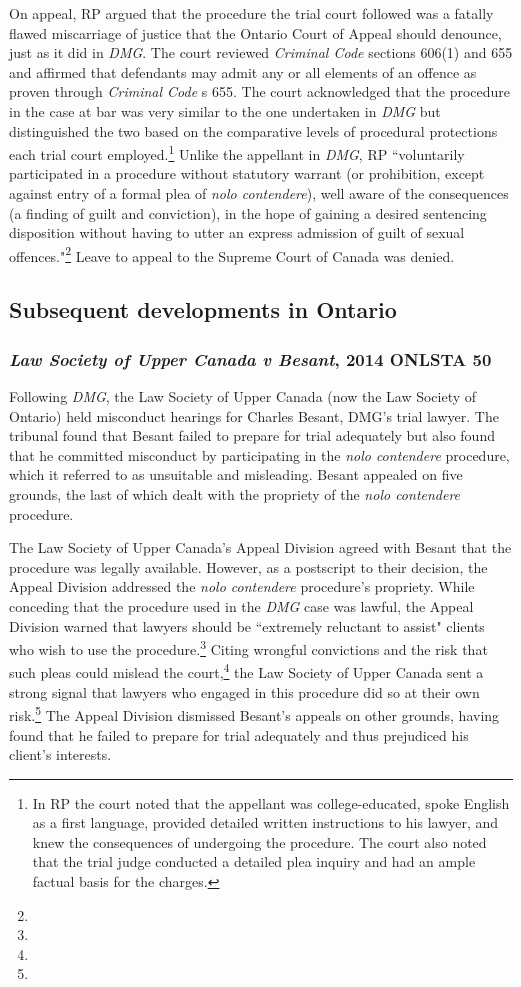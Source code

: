 On appeal, RP argued that the procedure the trial court followed was a fatally flawed miscarriage of justice that the Ontario Court of Appeal should denounce, just as it did in \textit{DMG}. The court reviewed \textit{Criminal Code} sections 606(1) and 655 and affirmed that defendants may admit any or all elements of an offence as proven through \textit{Criminal Code} s 655. The court acknowledged that the procedure in the case at bar was very similar to the one undertaken in \textit{DMG} but distinguished the two based on the comparative levels of procedural protections each trial court employed.\footnote{In RP the court noted that the appellant was college-educated, spoke English as a first language, provided detailed written instructions to his lawyer, and knew the consequences of undergoing the procedure. The court also noted that the trial judge conducted a detailed plea inquiry and had an ample factual basis for the charges.} Unlike the appellant in \textit{DMG}, RP ``voluntarily participated in a procedure without statutory warrant (or prohibition, except against entry of a formal plea of \textit{nolo contendere}), well aware of the consequences (a finding of guilt and conviction), in the hope of gaining a desired sentencing disposition without having to utter an express admission of guilt of sexual offences."\footnote{} Leave to appeal to the Supreme Court of Canada was denied.

\subsection{Subsequent developments in Ontario}

\subsubsection{\textit{Law Society of Upper Canada v Besant}, 2014 ONLSTA 50}

Following \textit{DMG}, the Law Society of Upper Canada (now the Law Society of Ontario) held misconduct hearings for Charles Besant, DMG's trial lawyer. The tribunal found that Besant failed to prepare for trial adequately but also found that he committed misconduct by participating in the \textit{nolo contendere} procedure, which it referred to as unsuitable and misleading. Besant appealed on five grounds, the last of which dealt with the propriety of the \textit{nolo contendere} procedure.

The Law Society of Upper Canada's Appeal Division agreed with Besant that the procedure was legally available. However, as a postscript to their decision, the Appeal Division addressed the \textit{nolo contendere} procedure's propriety. While conceding that the procedure used in the \textit{DMG} case was lawful, the Appeal Division warned that lawyers should be ``extremely reluctant to assist" clients who wish to use the procedure.\footnote{} Citing wrongful convictions and the risk that such pleas could mislead the court,\footnote{} the Law Society of Upper Canada sent a strong signal that lawyers who engaged in this procedure did so at their own risk.\footnote{} The Appeal Division dismissed Besant's appeals on other grounds, having found that he failed to prepare for trial adequately and thus prejudiced his client's interests.

